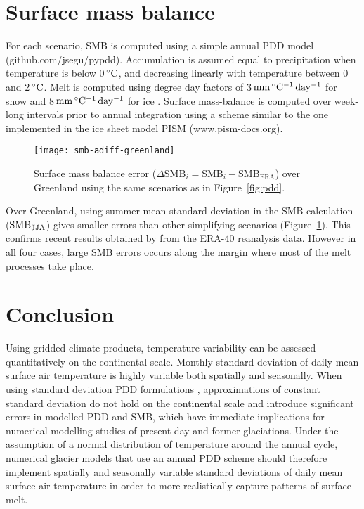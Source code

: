 \documentclass[review]{igs}
\begin{document}

\section{Surface mass balance}

For each scenario, SMB is computed using a simple annual PDD model (github.com/jsegu/pypdd). Accumulation is assumed equal to precipitation when temperature is below 0\,$\rm^\circ C$, and decreasing linearly with temperature between 0 and 2\,$\rm^\circ C$. Melt is computed using degree day factors of 3\,$\rm mm\,^\circ C^{-1}\,day^{-1}$ for snow and 8\,$\rm mm\,^\circ C^{-1}\,day^{-1}$ for ice \citep{huybrechts-dewolde-1999}. Surface mass-balance is computed over week-long intervals prior to annual integration using a scheme similar to the one implemented in the ice sheet model PISM (www.pism-docs.org).

\begin{figure}
  \centering\texttt{[image: smb-adiff-greenland]}
  \caption{Surface mass balance error ($\Delta\mathrm{SMB}_i = \mathrm{SMB}_i - \mathrm{SMB_{ERA}}$) over Greenland using the same scenarios as in Figure~\ref{fig:pdd}.}
  \label{fig:smb}
\end{figure}

Over Greenland, using summer mean standard deviation in the SMB calculation ($\rm SMB_{JJA}$) gives smaller errors than other simplifying scenarios (Figure~\ref{fig:smb}). This confirms recent results obtained by \citet{rau-rogozhina-2013} from the ERA-40 reanalysis data. However in all four cases, large SMB errors occurs along the margin where most of the melt processes take place.


\section{Conclusion}

Using gridded climate products, temperature variability can be assessed quantitatively on the continental scale. Monthly standard deviation of daily mean surface air temperature is highly variable both spatially and seasonally. When using standard deviation PDD formulations \citep{braithwaite-1984,reeh-1991,calov-greve-2005}, approximations of constant standard deviation do not hold on the continental scale and introduce significant errors in modelled PDD and SMB, which have immediate implications for numerical modelling studies of present-day and former glaciations. Under the assumption of a normal distribution of temperature around the annual cycle, numerical glacier models that use an annual PDD scheme should therefore implement spatially and seasonally variable standard deviations of daily mean surface air temperature in order to more realistically capture patterns of surface melt.
\end{document}
